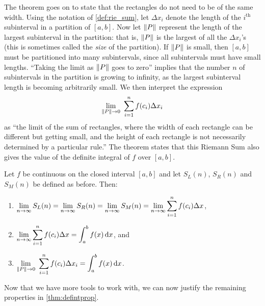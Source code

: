 The theorem goes on to state that the rectangles do not need to be of the same width. Using the notation of \autoref{def:rie_sum}, let $\Delta x_i$ denote the length of the $i^{\text{th}}$ subinterval in a partition of $[a,b]$. Now let $\left\lVert P \right\rVert$ represent the length of the largest subinterval in the partition: that is, $\left\lVert P \right\rVert$ is the largest of all the $\Delta x_i$'s (this is sometimes called the \emph{size} of the partition). If $\left\lVert P \right\rVert$ is small, then $[a,b]$ must be partitioned into many subintervals, since all subintervals must have small lengths. ``Taking the limit as $\left\lVert P \right\rVert$ goes to zero'' implies that the number $n$ of subintervals in the partition is growing to infinity, as the largest subinterval length is becoming arbitrarily small. We then interpret the expression 
\[\lim_{\norm{P}\to 0}\ \sum_{i=1}^n f(c_i)\Delta x_i\]
as ``the limit of the sum of rectangles, where the width of each rectangle can be different but getting small, and the height of each rectangle is not necessarily determined by a particular rule.'' The theorem states that this Riemann Sum also gives the value of the definite integral of $f$ over $[a,b]$.

{
\begin{theorem}\label{thm:riemannSum}%
Let $f$ be continuous on the closed interval $[a,b]$  and let $S_L(n)$, $S_R(n)$ and $S_M(n)$ be defined as before. Then:
\begin{enumerate}
	\item	$\displaystyle \lim_{n\to\infty} S_L(n) = \lim_{n\to\infty} S_R(n) = \lim_{n\to\infty} S_M(n) = \lim_{n\to\infty}\sum_{i=1}^n f(c_i)\Delta x$, 
	\item	$\displaystyle \lim_{n\to\infty}\sum_{i=1}^n f(c_i)\Delta x = \int_a^b f(x)\operatorname{d}\! x$, and
	\item	$\displaystyle \lim_{\left\lVert P \right\rVert\to 0}\ \sum_{i=1}^n f(c_i)\Delta x_i = \int_a^b f(x)\operatorname{d}\! x$.
\end{enumerate}
\end{theorem}}

Now that we have more tools to work with, we can now justify the remaining properties in \autoref{thm:defintprop}. 

%


